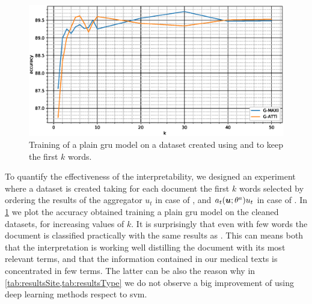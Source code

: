 \begin{figure}
  \centering
  \includegraphics[width=\floatwidth]{img/plotSintex.eps}
  \caption{Training of a plain \ac{gru} model on a dataset created
    using \maxi{} and \softmaxi{} to keep the first $k$ words.}
  \label{fig:sintex}
\end{figure}
To quantify the effectiveness of the interpretability, we designed an
experiment where a dataset is created taking for each document the
first $k$ words selected by  
ordering the results of the aggregator $u_t$ in case of \maxi{}, and
$a_t(\bm{u};\theta^a)u_t$ in case of \softmaxi{}. In \cref{fig:sintex}
we plot the accuracy obtained training a plain \ac{gru} model on the
cleaned datasets, for increasing values of $k$. It is surprisingly
that even with few words the document is classified practically with
the same results as \gru{}. This can means both that the
interpretation is working well distilling the document with its most
relevant terms, and that the information contained in our medical
texts is concentrated in few terms. The latter can be also the reason
why in \cref{tab:resultsSite,tab:resultsType} we do not observe a big
improvement of using deep learning methods respect to \ac{svm}.




